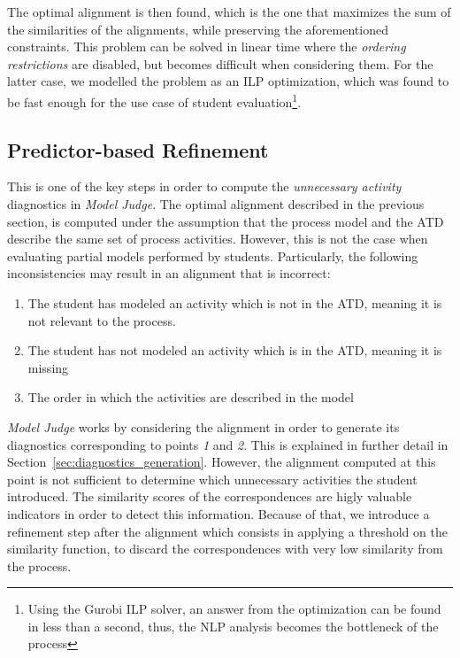 The optimal alignment is then found, which is the one that maximizes the sum of
the similarities of the alignments, while preserving the aforementioned
constraints. This problem can be solved in linear time where the \emph{ordering
  restrictions} are disabled, but becomes difficult when considering them. For
the latter case, we modelled the problem as an ILP optimization, which was found
to be fast enough for the use case of student evaluation\footnote{Using the
  Gurobi\cite{gurobi} ILP solver, an answer from the optimization can be found
  in less than a second, thus, the NLP analysis becomes the bottleneck of the
  process}.

\subsection{Predictor-based Refinement}
\label{sec:predictors}

This is one of the key steps in order to compute the \emph{unnecessary activity}
diagnostics in \emph{Model Judge}. The optimal alignment described in the
previous section, is computed under the assumption that the process model and
the ATD describe the same set of process activities. However, this is not the
case when evaluating partial models performed by students. Particularly, the
following inconsistencies may result in an alignment that is incorrect:

\begin{enumerate}
  \item The student has modeled an activity which is not in the ATD, meaning it
    is not relevant to the process.
  \item The student has not modeled an activity which is in the ATD, meaning it
    is missing 
  \item The order in which the activities are described in the model 
\end{enumerate}

\emph{Model Judge} works by considering the alignment in order to generate
its diagnostics corresponding to points \emph{1} and \emph{2}. This is explained
in further detail in Section~\ref{sec:diagnostics_generation}. However, the
alignment computed at this point is not sufficient to determine which
unnecessary activities the student introduced. The similarity scores of the
correspondences are higly valuable indicators in order to detect this
information. Because of that, we introduce a refinement step after the alignment
which consists in applying a threshold on the similarity function, to discard
the correspondences with very low similarity from the process.


